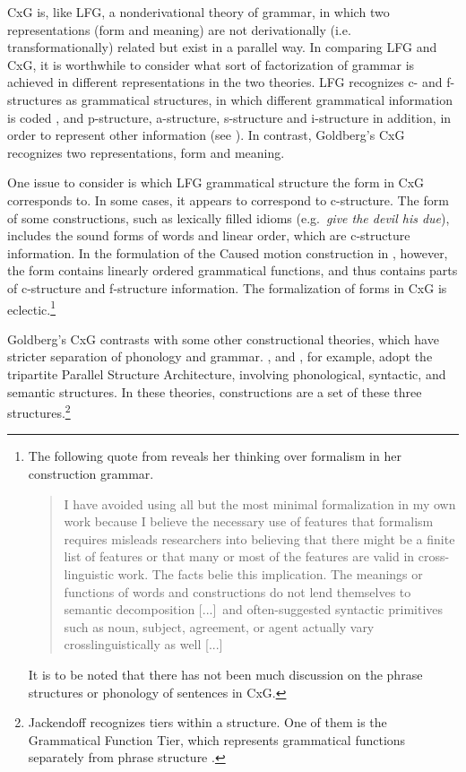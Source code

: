 \documentclass[output=paper,japanesefont,hidelinks]{langscibook}
\begin{document}
CxG is, like LFG, a nonderivational theory of grammar, in which two representations (form and meaning) are not derivationally (i.e. transformationally) related but exist in a parallel way. In comparing LFG and CxG, it is worthwhile to consider what sort of factorization of grammar is achieved in different representations in the two theories. LFG recognizes c- and f-structures as grammatical structures, in which different grammatical information is coded \citep{kaplanbresnan82}, and p-structure, a-structure, s-structure and i-structure in addition, in order to represent other information (see \citealt{DLM:LFG}). In contrast, Goldberg's CxG recognizes two representations, form and meaning.

One issue to consider is which LFG grammatical structure the form in CxG corresponds to. In some cases, it appears to correspond to c-structure. The form of some constructions, such as lexically filled idioms (e.g.\ \textit{give the devil his due}), includes the sound forms of words and linear order, which are c-structure information. In the formulation of the Caused motion construction in , however, the form contains linearly ordered grammatical functions, and thus contains parts of c-structure and f-structure information. The formalization of forms in CxG is eclectic.\footnote{The following quote from \citet{Goldberg2013} reveals her thinking over formalism in her construction grammar. 
\begin{quote}I have avoided using all but the most minimal formalization in my own work because I believe the necessary use of features that formalism requires misleads researchers into believing that there might be a finite list of features or that many or most of the features are valid in cross-linguistic work. The facts belie this implication. The meanings or functions of words and constructions do not lend themselves to semantic decomposition [...]\ and often-suggested syntactic primitives such as noun, subject, agreement, or agent actually vary crosslinguistically as well [...] \citep[30]{Goldberg2013}
\end{quote}
It is to be noted that there has not been much discussion on the phrase structures or phonology of sentences in CxG.}

Goldberg's CxG contrasts with some other constructional theories, which have stricter separation of phonology and grammar. \citet{jackendoff1997the-architecture}, \citet{JackendoffAudring2019} and \citet{Booij2010}, for example, adopt the tripartite Parallel Structure Architecture, involving phonological, syntactic, and semantic structures. In these theories, constructions are a set of these three structures.\footnote{Jackendoff recognizes tiers within a structure. One of them is the Grammatical Function Tier, which represents grammatical functions separately from phrase structure \citep[Chapter~6]{culicover2005simpler}.}
\end{document}
